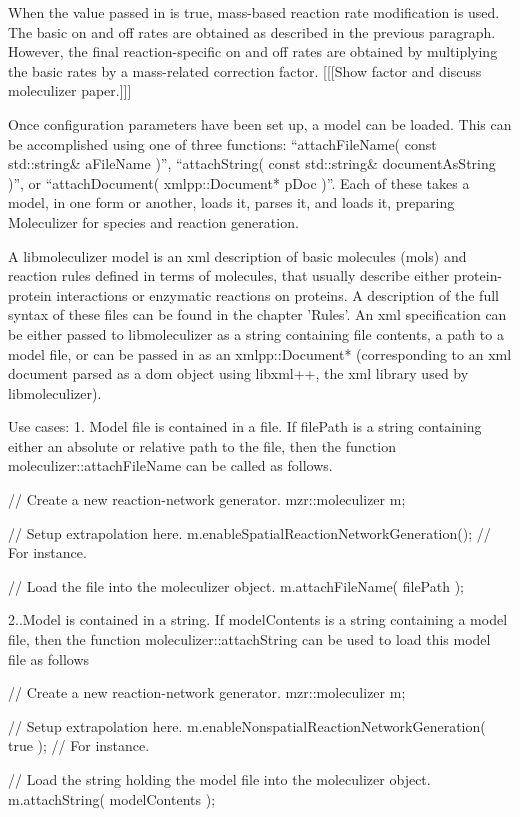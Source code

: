 When the value passed in is true, mass-based reaction rate
modification is used.  The basic on and off rates are obtained as
described in the previous paragraph.  However, the final
reaction-specific on and off rates are obtained by multiplying the
basic rates by a mass-related correction factor.  [[[Show factor and
discuss moleculizer paper.]]]

Once configuration parameters have been set up, a model can be
loaded.  This can be accomplished using one of three functions:
``attachFileName( const std::string& aFileName )'', 
``attachString( const std::string& documentAsString )'',
or ``attachDocument( xmlpp::Document* pDoc )''.  Each of these takes a
model, in one form or another, loads it, parses it, and loads it,
preparing Moleculizer for species and reaction generation.  

A libmoleculizer model is an xml description of basic molecules (mols) and
reaction rules defined in terms of molecules, that usually describe
either protein-protein interactions or enzymatic reactions on
proteins.  A description of the full syntax of these files can be
found in the chapter 'Rules'.  An xml specification can be either
passed to libmoleculizer as a string containing file contents, a path
to a model file, or can be passed in as an xmlpp::Document*
(corresponding to an xml document parsed as a dom object using
libxml++, the xml library used by libmoleculizer).

Use cases:
1.  Model file is contained in a file.
If filePath is a string containing either an absolute or relative path
to the file, then the function moleculizer::attachFileName can be
called as follows.  

// Create a new reaction-network generator.
mzr::moleculizer m;

// Setup extrapolation here. 
m.enableSpatialReactionNetworkGeneration(); // For instance.

// Load the file into the moleculizer object.
m.attachFileName( filePath );

2..Model is contained in a string.
If modelContents is a string containing a model file, then the
function moleculizer::attachString can be used to load this model file
as follows

// Create a new reaction-network generator.
mzr::moleculizer m; 

// Setup extrapolation here.
m.enableNonspatialReactionNetworkGeneration( true ); // For instance.

// Load the string holding the model file into the moleculizer object.
m.attachString( modelContents );


